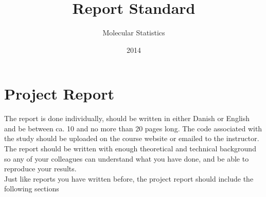\documentclass{article}
\title{Report Standard}
\author{Molecular Statistics}
\date{2014}
\begin{document}


\maketitle

\section*{Project Report}

The report is done individually, should be written in either Danish or English and be between ca. 10 and no more than 20 pages long.
The code associated with the study should be uploaded on the course website or emailed to the instructor.\\

The report should be written with enough theoretical and technical background so any of your colleagues can understand what you have done, and be able to reproduce your results.\\

Just like reports you have written before, the project report should include the following sections
\end{document}
